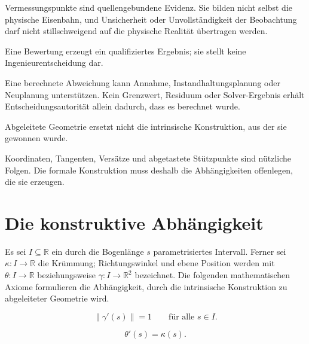 Vermessungspunkte sind quellengebundene Evidenz. Sie bilden nicht selbst die
physische Eisenbahn, und Unsicherheit oder Unvollständigkeit der Beobachtung
darf nicht stillschweigend auf die physische Realität übertragen werden.

\begin{axiom}
\label{ax:evaluation-decision-separation}
Eine Bewertung erzeugt ein qualifiziertes Ergebnis; sie stellt keine
Ingenieurentscheidung dar.
\end{axiom}

Eine berechnete Abweichung kann Annahme, Instandhaltungsplanung oder
Neuplanung unterstützen. Kein Grenzwert, Residuum oder Solver-Ergebnis erhält
Entscheidungsautorität allein dadurch, dass es berechnet wurde.

\begin{axiom}
\label{ax:intrinsic-derived-separation}
Abgeleitete Geometrie ersetzt nicht die intrinsische Konstruktion, aus der sie
gewonnen wurde.
\end{axiom}

Koordinaten, Tangenten, Versätze und abgetastete Stützpunkte sind nützliche
Folgen. Die formale Konstruktion muss deshalb die Abhängigkeiten offenlegen,
die sie erzeugen.

\section{Die konstruktive Abhängigkeit}

Es sei \(I\subseteq\mathbb{R}\) ein durch die Bogenlänge \(s\)
parametrisiertes Intervall. Ferner sei
\(\kappa:I\rightarrow\mathbb{R}\) die Krümmung; Richtungswinkel und ebene
Position werden mit \(\theta:I\rightarrow\mathbb{R}\) beziehungsweise
\(\gamma:I\rightarrow\mathbb{R}^{2}\) bezeichnet. Die folgenden
mathematischen Axiome formulieren die Abhängigkeit, durch die intrinsische
Konstruktion zu abgeleiteter Geometrie wird.

\begin{axiom}[Bogenlängenparametrisierung]
\label{ax:arc-length-parameterization}
\[
\lVert\gamma'(s)\rVert=1
\qquad\text{für alle }s\in I.
\]
\end{axiom}

\begin{axiom}
\label{ax:heading-evolution}
\[
\theta'(s)=\kappa(s).
\]
\end{axiom}

